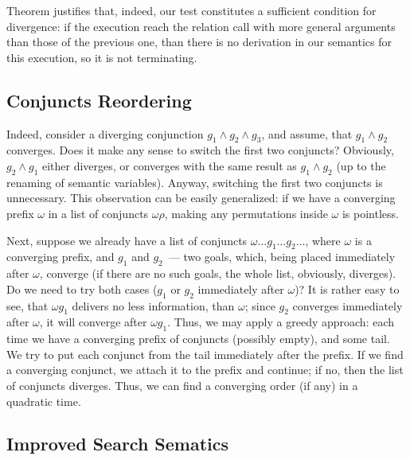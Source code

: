 Theorem justifies that, indeed, our test constitutes a sufficient condition for divergence: if the execution reach the relation call with more general arguments than those of the previous one, than there is no derivation in our semantics for this execution, so it is not terminating.

\subsection{Conjuncts Reordering}

Indeed, consider a diverging conjunction \mbox{$g_1\wedge g_2\wedge g_3$}, and assume, that \mbox{$g_1\wedge g_2$} converges. 
Does it make any sense to switch the first two conjuncts? Obviously, \mbox{$g_2\wedge g_1$} either diverges, or converges with the same 
result as \mbox{$g_1\wedge g_2$} (up to the renaming of semantic variables). Anyway, switching the first two conjuncts is
unnecessary. This observation can be easily generalized: if we have a converging prefix $\omega$ in a list of conjuncts $\omega\rho$, making
any permutations inside $\omega$ is pointless.

Next, suppose we already have a list of conjuncts \mbox{$\omega\dots g_1\dots g_2\dots$}, where $\omega$ is a converging prefix, and
$g_1$ and $g_2$~--- two goals, which, being placed immediately after $\omega$, converge (if there are no such
goals, the whole list, obviously, diverges). Do we need to try both cases ($g_1$ or $g_2$ immediately after $\omega$)? 
It is rather easy to see, that \mbox{$\omega g_1$} delivers no less information, than \mbox{$\omega$}; since
$g_2$ converges immediately after $\omega$, it will converge after \mbox{$\omega g_1$}. Thus, we may apply a greedy approach: each
time we have a converging prefix of conjuncts (possibly empty), and some tail. We try to put each conjunct from the tail 
immediately after the prefix. If we find a converging conjunct, we attach it to the prefix and continue; if no, then the list of 
conjuncts diverges. Thus, we can find a converging order (if any) in a quadratic time.

\subsection{Improved Search Sematics}

\newcommand{\extSearchRule}[8] {
  #1, #2, #3, #4 \vdash (#5, #6) \xRightarrow{#7}_{e} #8}

